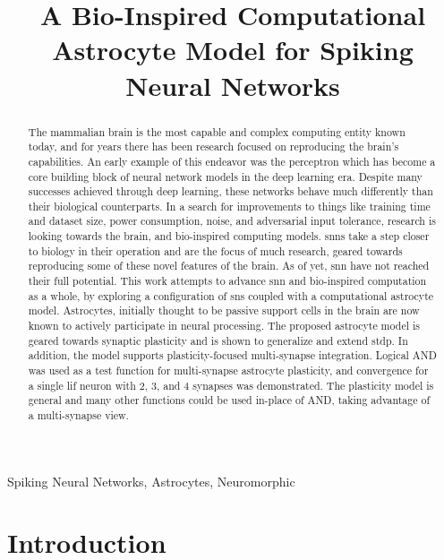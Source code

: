 \documentclass[conference]{IEEEtran}
\title{A Bio-Inspired Computational Astrocyte Model for Spiking Neural Networks}
\begin{document}
\maketitle

\begin{abstract}
The mammalian brain is the most capable and complex computing entity known
today, and for years there has been research focused on reproducing the brain's
capabilities. An early example of this endeavor was the perceptron which has
become a core building block of neural network models in the deep learning
era. Despite many successes achieved through deep learning, these networks
behave much differently than their biological counterparts. In a search for
improvements to things like training time and dataset size, power consumption,
noise, and adversarial input tolerance, research is looking towards the brain,
and bio-inspired computing models. \Glspl{snn} take a step closer to biology in
their operation and are the focus of much research, geared towards reproducing
some of these novel features of the brain. As of yet, \gls{snn} have not reached
their full potential. This work attempts to advance \gls{snn} and bio-inspired
computation as a whole, by exploring a configuration of \glspl{sn} coupled with
a computational astrocyte model. Astrocytes, initially thought to be passive
support cells in the brain are now known to actively participate in neural
processing. The proposed astrocyte model is geared towards synaptic plasticity
and is shown to generalize and extend \gls{stdp}. In addition, the model
supports plasticity-focused multi-synapse integration. Logical AND was used as a
test function for multi-synapse astrocyte plasticity, and convergence for a
single \gls{lif} neuron with 2, 3, and 4 synapses was demonstrated. The
plasticity model is general and many other functions could be used in-place of
AND, taking advantage of a multi-synapse view.

\end{abstract}

\begin{IEEEkeywords}
Spiking Neural Networks, Astrocytes, Neuromorphic
\end{IEEEkeywords}

\section{Introduction}
\end{document}
